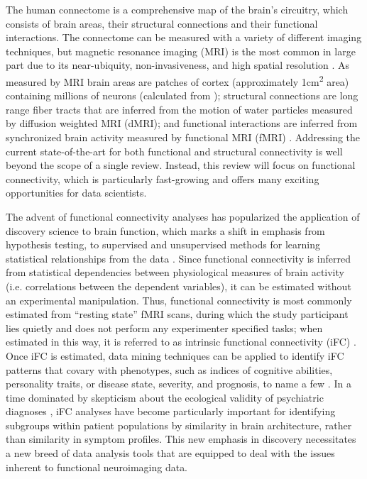 \documentclass{bmcart}
\begin{document}
The human connectome is a comprehensive map of the brain's circuitry, which consists of brain areas, their structural connections and their functional interactions. The connectome can be measured with a variety of different imaging techniques, but magnetic resonance imaging (MRI) is the most common in large part due to its near-ubiquity, non-invasiveness, and high spatial resolution \cite{Craddock2013}. As measured by MRI brain areas are patches of cortex (approximately 1\si{\centi\meter\squared} area) \cite{Varela2001} containing millions of neurons (calculated from \cite{Aguirre2014}); structural connections are long range fiber tracts that are inferred from the motion of water particles measured by diffusion weighted MRI (dMRI); and functional interactions are inferred from synchronized brain activity measured by functional MRI (fMRI) \cite{Behrens2012}. Addressing the current state-of-the-art for both functional and structural connectivity is well beyond the scope of a single review. Instead, this review will focus on functional connectivity, which is particularly fast-growing and offers many exciting opportunities for data scientists.

The advent of functional connectivity analyses has popularized the application of discovery science to brain function, which marks a shift in emphasis from hypothesis testing, to supervised and unsupervised methods for learning statistical relationships from the data \cite{Biswal2010}. Since functional connectivity is inferred from statistical dependencies between physiological measures of brain activity (i.e. correlations between the dependent variables), it can be estimated without an experimental manipulation. Thus, functional connectivity is most commonly estimated from ``resting state'' fMRI scans, during which the study participant lies quietly and does not perform any experimenter specified tasks; when estimated in this way, it is referred to as intrinsic functional connectivity (iFC) \cite{Biswal1995}. Once iFC is estimated, data mining techniques can be applied to identify iFC patterns that covary with phenotypes, such as indices of cognitive abilities, personality traits, or disease state, severity, and prognosis, to name a few \cite{Varoquaux2013}. In a time dominated by skepticism about the ecological validity of psychiatric diagnoses \cite{Kapur2012}, iFC analyses have become particularly important for identifying subgroups within patient populations by similarity in brain architecture, rather than similarity in symptom profiles. This new emphasis in discovery necessitates a new breed of data analysis tools that are equipped to deal with the issues inherent to functional neuroimaging data.
\end{document}
